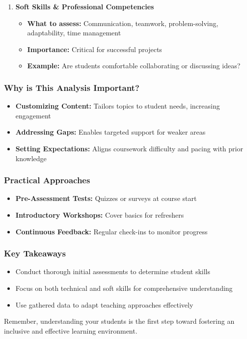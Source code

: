 \documentclass{beamer}
\begin{document}
\begin{frame}[fragile]
\begin{enumerate}
        \vspace{0.5em}
        \item \textbf{Soft Skills \& Professional Competencies}
        \begin{itemize}
            \item \textbf{What to assess:} Communication, teamwork, problem-solving, adaptability, time management
            \item \textbf{Importance:} Critical for successful projects
            \item \textbf{Example:} Are students comfortable collaborating or discussing ideas?
        \end{itemize}
    \end{enumerate}
\end{frame}

\begin{frame}[fragile]
    \frametitle{Why is This Analysis Important?}
    \begin{itemize}
        \item \textbf{Customizing Content:} Tailors topics to student needs, increasing engagement
        \item \textbf{Addressing Gaps:} Enables targeted support for weaker areas
        \item \textbf{Setting Expectations:} Aligns coursework difficulty and pacing with prior knowledge
    \end{itemize}
\end{frame}

\begin{frame}[fragile]
    \frametitle{Practical Approaches}
    \begin{itemize}
        \item \textbf{Pre-Assessment Tests:} Quizzes or surveys at course start
        \item \textbf{Introductory Workshops:} Cover basics for refreshers
        \item \textbf{Continuous Feedback:} Regular check-ins to monitor progress
    \end{itemize}
\end{frame}

\begin{frame}[fragile]
    \frametitle{Key Takeaways}
    \begin{itemize}
        \item Conduct thorough initial assessments to determine student skills
        \item Focus on both technical and soft skills for comprehensive understanding
        \item Use gathered data to adapt teaching approaches effectively
    \end{itemize}
    \vspace{1em}
    Remember, understanding your students is the first step toward fostering an inclusive and effective learning environment.
\end{frame}
\end{document}
